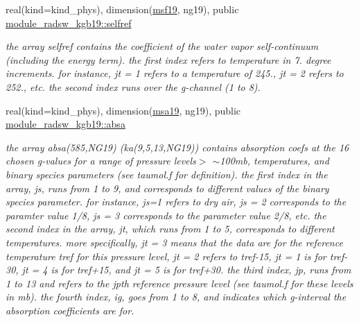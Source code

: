 \begin{DoxyCompactItemize}
real(kind=kind\+\_\+phys), dimension(\hyperlink{group__module__radsw__kgbnn_ga86778b12ff439f4f83fda891e7ae2bfe}{msf19}, ng19), public \hyperlink{group__module__radsw__kgbnn_gadb26cae00c05ac5c048a4db5a319a2eb}{module\+\_\+radsw\+\_\+kgb19\+::selfref}
\begin{DoxyCompactList}\small\item\em the array selfref contains the coefficient of the water vapor self-\/continuum (including the energy term). the first index refers to temperature in 7. degree increments. for instance, jt = 1 refers to a temperature of 245., jt = 2 refers to 252., etc. the second index runs over the g-\/channel (1 to 8). \end{DoxyCompactList}\item 
\mbox{\label{group__module__radsw__kgbnn_gad9a6fc80122a2f06d9f2277d74e00c85}} 
real(kind=kind\+\_\+phys), dimension(\hyperlink{namespacemodule__radsw__kgb19_a498993cce64baa8f22c8dfdce632cf85}{msa19}, ng19), public \hyperlink{group__module__radsw__kgbnn_gad9a6fc80122a2f06d9f2277d74e00c85}{module\+\_\+radsw\+\_\+kgb19\+::absa}
\begin{DoxyCompactList}\small\item\em the array absa(585,\+N\+G19) (ka(9,5,13,\+N\+G19)) contains absorption coefs at the 16 chosen g-\/values for a range of pressure levels$>$ $\sim$100mb, temperatures, and binary species parameters (see taumol.\+f for definition). the first index in the array, js, runs from 1 to 9, and corresponds to different values of the binary species parameter. for instance, js=1 refers to dry air, js = 2 corresponds to the paramter value 1/8, js = 3 corresponds to the parameter value 2/8, etc. the second index in the array, jt, which runs from 1 to 5, corresponds to different temperatures. more specifically, jt = 3 means that the data are for the reference temperature tref for this pressure level, jt = 2 refers to tref-\/15, jt = 1 is for tref-\/30, jt = 4 is for tref+15, and jt = 5 is for tref+30. the third index, jp, runs from 1 to 13 and refers to the jpth reference pressure level (see taumol.\+f for these levels in mb). the fourth index, ig, goes from 1 to 8, and indicates which g-\/interval the absorption coefficients are for. \end{DoxyCompactList}\item 
\mbox{\label{group__module__radsw__kgbnn_gad1171c012a1615c4b98eb3e95276867d}} 

\end{DoxyCompactItemize}
